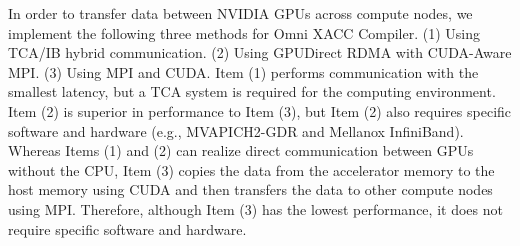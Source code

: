 In order to transfer data between NVIDIA GPUs across compute nodes,
we implement the following three methods for Omni XACC Compiler.
(1) Using TCA/IB hybrid communication\cite{tca,tca2}.
(2) Using GPUDirect RDMA with CUDA-Aware MPI.
(3) Using MPI and CUDA.
Item (1) performs communication with the smallest latency, but a TCA system is required for the computing environment.
Item (2) is superior in performance to Item (3), but Item (2) also requires specific software and hardware (e.g., MVAPICH2-GDR and Mellanox InfiniBand).
Whereas Items (1) and (2) can realize direct communication between GPUs without the CPU, 
Item (3) copies the data from the accelerator memory to the host memory using CUDA and then transfers the data to other compute nodes using MPI.
Therefore, although Item (3) has the lowest performance, it does not require specific software and hardware.
